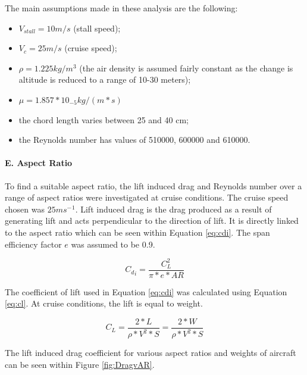 \documentclass[12pt]{article}
\begin{document}
\noindent The main assumptions made in these analysis are the following: \\

\begin{itemize}
    \item $V_{stall} = 10 m/s$ (stall speed);
    \item $V_c = 25 m/s$ (cruise speed);
    \item $\rho = 1.225 kg/m^3$ (the air density is assumed fairly constant as the change is altitude is reduced to a range of 10-30 meters);
    \item $\mu = 1.857*10_{-5}kg/(m*s)$ 
    \item the chord length varies between 25 and 40 cm;
    \item the Reynolds number has values of 510000, 600000 and 610000. 
\end{itemize}

\paragraph{E. Aspect Ratio} To find a suitable aspect ratio, the lift induced drag and Reynolds number over a range of aspect ratios were investigated at cruise conditions. The cruise speed chosen was $25ms{{^-}^1}$.  Lift induced drag is the drag produced as a result of generating lift and acts perpendicular to the direction of lift. It is directly linked to the aspect ratio which can be seen within Equation \ref{eq:cdi}. The span efficiency factor $e$ was assumed to be 0.9. 

\begin{equation} \label{eq:cdi}
    C{{_d}_i} = \frac{C_L^2}{\pi*e*AR}
\end{equation}

\noindent The coefficient of lift used in Equation \ref{eq:cdi}  was calculated using Equation \ref{eq:cl}. At cruise conditions, the lift is equal to weight. 

\begin{equation} \label{eq:cl}
    C{_L} = \frac{2*L}{\rho*{V^2}*S} = \frac{2*W}{\rho*{V^2}*S}
\end{equation}

\noindent The lift induced drag coefficient for various aspect ratios and weights of aircraft can be seen within Figure \ref{fig:DragvAR}. \\
\end{document}
